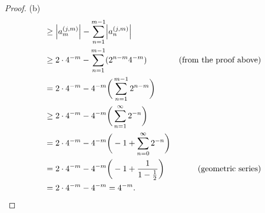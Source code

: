 \begin{proof}{(b)}
\begin{align*}
     & \geq \abs{a_m^{(j, m)}} - \sum_{n = 1}^{m - 1} \abs{a_n^{(j, m)}}                                                                      \\
     & \geq 2 \cdot 4^{-m} - \sum_{n = 1}^{m - 1} (2^{n - m} 4^{-m})                                   & \text{(from the proof above)}        \\
     & = 2 \cdot 4^{-m} - 4^{-m} \bigg(\sum_{n = 1}^{m - 1} 2^{n - m}\bigg)                                                                   \\
     & \geq 2 \cdot 4^{-m} - 4^{-m} \bigg(\sum_{n = 1}^\infty 2^{-n}\bigg)                                                                    \\
     & = 2 \cdot 4^{-m} - 4^{-m} \bigg(-1 + \sum_{n = 0}^\infty 2^{-n}\bigg)                                                                  \\
     & = 2 \cdot 4^{-m} - 4^{-m} \bigg(-1 + \frac{1}{1 - \frac{1}{2}}\bigg)                            & \text{(geometric series)}            \\
     & = 2 \cdot 4^{-m} - 4^{-m} = 4^{-m}.
  \end{align*}
\end{proof}

